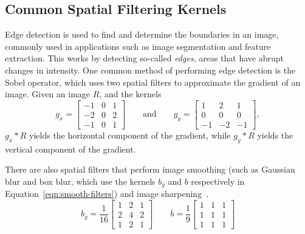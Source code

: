 \subsection{Common Spatial Filtering Kernels}
Edge detection is used to find and determine the boundaries in an image, commonly used in applications such as image segmentation and feature extraction. This works by detecting so-called \textit{edges}, areas that have abrupt changes in intensity.
One common method of performing edge detection is the Sobel operator, which uses two spatial filters to approximate the gradient of an image. Given an image $R$, and the kernels
\begin{equation}
    g_x =
    \begin{bmatrix}
        -1 & 0 & 1 \\
        -2 & 0 & 2 \\
        -1 & 0 & 1
    \end{bmatrix}
    \qquad\text{and}\qquad
    g_y =
    \begin{bmatrix}
        1 & 2 & 1 \\
        0 & 0 & 0 \\
        -1 & -2 & -1
    \end{bmatrix},
\end{equation}
$g_x \ast R$ yields the horizontal component of the gradient, while $g_y \ast R$ yields the vertical component of the gradient.

There are also spatial filters that perform image smoothing (such as Gaussian blur and box blur, which use the kernels $b_g$ and $b$ respectively in Equation~\ref{eqn:smooth-filters}) and image sharpening~\cite{gonzalez_digital_2008}.
\begin{equation}
    \label{eqn:smooth-filters}
    b_g = \frac{1}{16}
    \begin{bmatrix}
        1 & 2 & 1 \\
        2 & 4 & 2 \\
        1 & 2 & 1
    \end{bmatrix}
    \qquad
    b = \frac{1}{9}
    \begin{bmatrix}
        1 & 1 & 1 \\
        1 & 1 & 1 \\
        1 & 1 & 1
    \end{bmatrix}
\end{equation}

